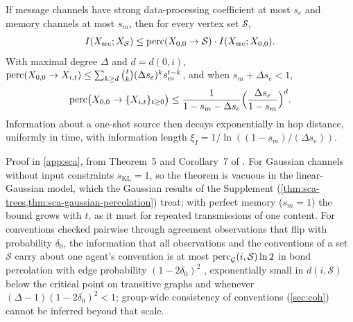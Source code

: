 \begin{theorem}\label{thm:sca-percolation}
If message channels have strong data-processing coefficient at most $s_e$ and memory channels at most $s_m$, then for every vertex set $\mathcal S$,
\begin{equation}\label{eq:sca-perc}
I(X_{\mathrm{src}};X_{\mathcal S})\le\operatorname{perc}(X_{0,0}\to\mathcal S)\cdot I(X_{\mathrm{src}};X_{0,0}).
\end{equation}
With maximal degree $\Delta$ and $d=d(0,i)$, $\operatorname{perc}(X_{0,0}\to X_{i,t})\le\sum_{k\ge d}\binom tk(\Delta s_e)^ks_m^{t-k}$, and when $s_m+\Delta s_e<1$,
\begin{equation}\label{eq:sca-perc-union}
\operatorname{perc}\bigl(X_{0,0}\to\{X_{i,t}\}_{t\ge0}\bigr)\le\frac{1}{1-s_m-\Delta s_e}\Bigl(\frac{\Delta s_e}{1-s_m}\Bigr)^d.
\end{equation}
Information about a one-shot source then decays exponentially in hop distance, uniformly in time, with information length $\xi_I=1/\ln((1-s_m)/(\Delta s_e))$.
\end{theorem}
Proof in \cref{app:sca}, from Theorem~5 and Corollary~7 of \citet{polyanskiy2017strong}. For Gaussian channels without input constraints $s_{\mathrm{KL}}=1$, so the theorem is vacuous in the linear-Gaussian model, which the Gaussian results of the Supplement (\cref{thm:sca-trees,thm:sca-gaussian-percolation}) treat; with perfect memory ($s_m=1$) the bound grows with $t$, as it must for repeated transmissions of one content. For conventions checked pairwise through agreement observations that flip with probability $\delta_0$, the information that all observations and the conventions of a set $\mathcal S$ carry about one agent's convention is at most $\operatorname{perc}_{\mathcal G}(i,\mathcal S)\ln2$ in bond percolation with edge probability $(1-2\delta_0)^2$ \citep[Theorem~1]{polyanskiy2019application}, exponentially small in $d(i,\mathcal S)$ below the critical point on transitive graphs \citep{duminilcopin2016new} and whenever $(\Delta-1)(1-2\delta_0)^2<1$; group-wide consistency of conventions (\cref{sec:coh}) cannot be inferred beyond that scale.


